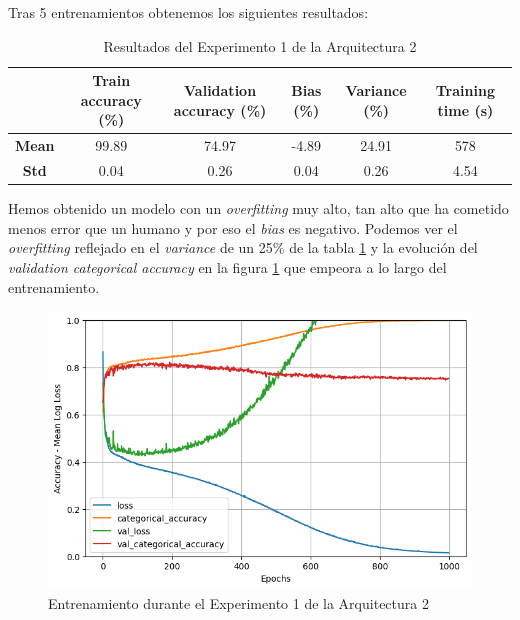\documentclass{article}
\begin{document}
			Tras 5 entrenamientos obtenemos los siguientes resultados:
			
			\begin{table}[!h]
				\begin{center}
					\begin{tabular}{ c | c | c | c | c | c |}
						\ & \textbf{Train accuracy (\%)} & \textbf{Validation accuracy (\%)} & \textbf{Bias (\%)} & \textbf{Variance (\%)} & \textbf{Training time (s)} \\ \hline
						\textbf{Mean} & 99.89 & 74.97 & -4.89 & 24.91 & 578\\ \hline
						\textbf{Std} & 0.04 & 0.26 & 0.04 & 0.26 & 4.54 \\ \hline
					\end{tabular}
					\caption{Resultados del Experimento 1 de la Arquitectura 2}
					\label{tab:res-d-a2-e1}
				\end{center}
			\end{table}
			
			Hemos obtenido un modelo con un \textit{overfitting} muy alto, tan alto que ha cometido menos error que un humano y por eso el \textit{bias} es negativo. Podemos ver el \textit{overfitting} reflejado en el \textit{variance} de un 25\% de la tabla \ref{tab:res-d-a2-e1} y la evoluci\'on del \textit{validation categorical accuracy} en la figura \ref{d-tr-a2-e1} que empeora a lo largo del entrenamiento.
			
			\begin{figure}[!h]
				\begin{center}
					\includegraphics[scale=0.5]{d-tr-a2-e1.png}		
					\caption{Entrenamiento durante el Experimento 1 de la Arquitectura 2}	
					\label{d-tr-a2-e1}
				\end{center}
			\end{figure}
			
\end{document}
